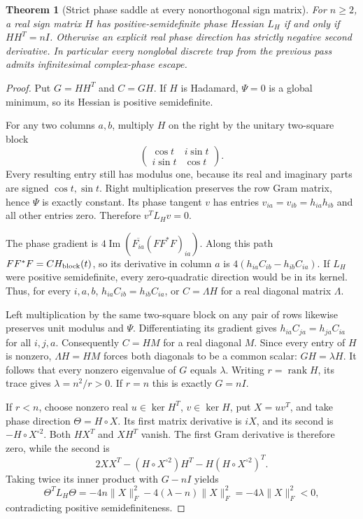 \documentclass[11pt]{article}
\newtheorem{theorem}{Theorem}[section]
\begin{document}
\begin{theorem}[Strict phase saddle at every nonorthogonal sign matrix]
For $n\ge2$, a real sign matrix $H$ has positive-semidefinite
phase Hessian $L_H$ if and only if $HH^T=nI$.
Otherwise an explicit real phase direction has strictly negative
second derivative. In particular every nonglobal discrete trap
from the previous pass admits infinitesimal complex-phase escape.
\end{theorem}
\begin{proof}
Put $G=HH^T$ and $C=GH$. If $H$ is Hadamard, $\Psi=0$ is a global
minimum, so its Hessian is positive semidefinite.

For any two columns $a,b$, multiply $H$ on the right by the unitary
two-square block
\[
 \begin{pmatrix}\cos t&i\sin t\\i\sin t&\cos t\end{pmatrix}.
\]
Every resulting entry still has modulus one, because its real and
imaginary parts are signed $\cos t,\sin t$. Right multiplication
preserves the row Gram matrix, hence $\Psi$ is exactly constant.
Its phase tangent $v$ has entries
$v_{ia}=v_{ib}=h_{ia}h_{ib}$ and all other entries zero.
Therefore $v^TL_Hv=0$.

The phase gradient is
$4\operatorname{Im}(\overline{F_{ia}}(FF^*F)_{ia})$.
Along this path $FF^*F=CH_{\rm block}(t)$, so its derivative in
column $a$ is $4(h_{ia}C_{ib}-h_{ib}C_{ia})$.
If $L_H$ were positive semidefinite, every zero-quadratic direction
would be in its kernel. Thus, for every $i,a,b$,
$h_{ia}C_{ib}=h_{ib}C_{ia}$, or $C=\Lambda H$ for a real diagonal
matrix $\Lambda$.

Left multiplication by the same two-square block on any pair of
rows likewise preserves unit modulus and $\Psi$. Differentiating
its gradient gives $h_{ia}C_{ja}=h_{ja}C_{ia}$ for all $i,j,a$.
Consequently $C=H M$ for a real diagonal $M$. Since every entry of
$H$ is nonzero, $\Lambda H=HM$ forces both diagonals to be a
common scalar: $GH=\lambda H$.
It follows that every nonzero eigenvalue of $G$ equals $\lambda$.
Writing $r=\operatorname{rank}H$, its trace gives $\lambda=n^2/r>0$.
If $r=n$ this is exactly $G=nI$.

If $r<n$, choose nonzero real $u\in\ker H^T$, $v\in\ker H$,
put $X=uv^T$, and take phase direction $\Theta=H\circ X$.
Its first matrix derivative is $iX$, and its second is
$-H\circ X^{\circ2}$. Both $HX^T$ and $XH^T$ vanish.
The first Gram derivative is therefore zero, while the second is
\[
 2XX^T-(H\circ X^{\circ2})H^T
       -H(H\circ X^{\circ2})^T.
\]
Taking twice its inner product with $G-nI$ yields
\[
 \Theta^TL_H\Theta
 =-4n\|X\|_F^2-4(\lambda-n)\|X\|_F^2
 =-4\lambda\|X\|_F^2<0,
\]
contradicting positive semidefiniteness.
\end{proof}
\end{document}
